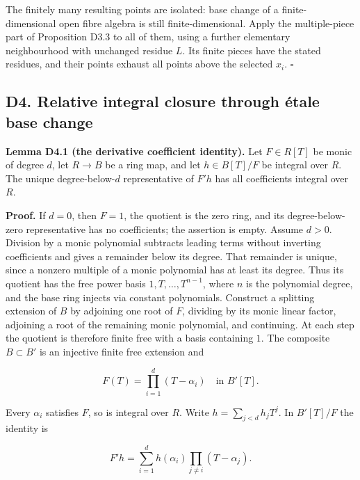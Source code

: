 \documentclass[11pt,a4paper,openany]{report}
\begin{document}
The finitely many resulting points are isolated: base change of a finite-dimensional open fibre algebra is still finite-dimensional. Apply the multiple-piece part of Proposition D3.3 to all of them, using a further elementary neighbourhood with unchanged residue \(L\). Its finite pieces have the stated residues, and their points exhaust all points above the selected \(x_i\). \(\square\)

\subsection{D4. Relative integral closure through étale base change}\label{AG-RG-S04-d4.-relative-integral-closure-through-uxe9tale-base-change}

\textbf{Lemma D4.1 (the derivative coefficient identity).} Let \(F\in R[T]\) be monic of degree \(d\), let \(R\to B\) be a ring map, and let \(h\in B[T]/F\) be integral over \(R\). The unique degree-below-\(d\) representative of \(F'h\) has all coefficients integral over \(R\).

\textbf{Proof.} If \(d=0\), then \(F=1\), the quotient is the zero ring, and its degree-below-zero representative has no coefficients; the assertion is empty. Assume \(d>0\). Division by a monic polynomial subtracts leading terms without inverting coefficients and gives a remainder below its degree. That remainder is unique, since a nonzero multiple of a monic polynomial has at least its degree. Thus its quotient has the free power basis \(1,T,\ldots,T^{n-1}\), where \(n\) is the polynomial degree, and the base ring injects via constant polynomials. Construct a splitting extension of \(B\) by adjoining one root of \(F\), dividing by its monic linear factor, adjoining a root of the remaining monic polynomial, and continuing. At each step the quotient is therefore finite free with a basis containing \(1\). The composite \(B\subset B'\) is an injective finite free extension and

\[
F(T)=\prod_{i=1}^d(T-\alpha_i)\quad\text{in }B'[T].
\]

Every \(\alpha_i\) satisfies \(F\), so is integral over \(R\). Write \(h=\sum_{j<d}h_jT^j\). In \(B'[T]/F\) the identity is

\[
F'h=\sum_{i=1}^dh(\alpha_i)\prod_{j\ne i}(T-\alpha_j).                 \tag{4.1}
\]
\end{document}

